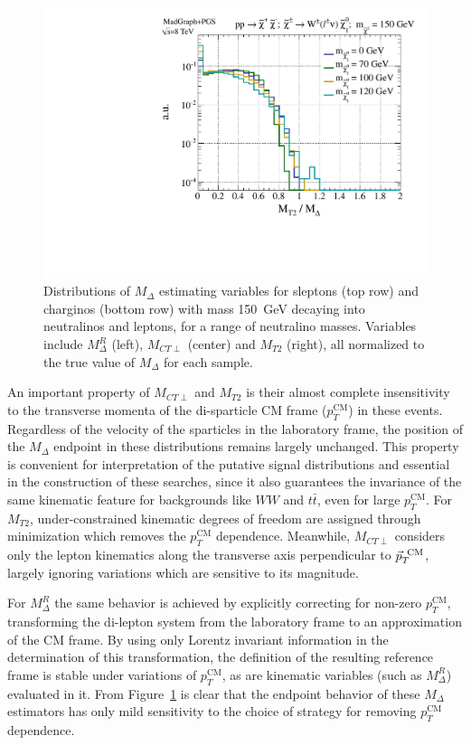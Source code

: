\begin{figure}[ht]
\includegraphics[width=0.3\columnwidth]{fig/sectionIII/MT2_norm_log_1D_chargino.pdf} 
\caption{Distributions of $M_{\Delta}$ estimating variables for sleptons (top row) and charginos (bottom row) with mass 150~GeV decaying into neutralinos and leptons, for a range of neutralino masses. Variables include $M_{\Delta}^{R}$ (left), $M_{CT\perp}$ (center) and $M_{T2}$ (right), all normalized to the true value of $M_{\Delta}$ for each sample. \label{fig:compare}}
\end{figure}

An important property of $M_{CT\perp}$ and $M_{T2}$ is their almost complete insensitivity to the transverse momenta of the di-sparticle CM frame ($p_{T}^\text{CM}$) in these events. Regardless of the velocity of the sparticles in the laboratory frame, the position of the $M_{\Delta}$ endpoint in these distributions remains largely unchanged. This property is convenient for interpretation of the putative signal distributions and essential in the construction of these searches, since it also guarantees the invariance of the same kinematic feature for backgrounds like $WW$ and $t\bar{t}$, even for large $p_{T}^\text{CM}$.  For $M_{T2}$, under-constrained kinematic degrees of freedom are assigned through minimization which removes the $p_{T}^\text{CM}$ dependence. Meanwhile, $M_{CT\perp}$ considers only the lepton kinematics along the transverse axis perpendicular to $\vec{p}_{T}^\text{\, CM}$, largely ignoring variations which are sensitive to its magnitude. 

For $M_{\Delta}^{R}$ the same behavior is achieved by explicitly correcting for non-zero $p_{T}^\text{CM}$, transforming the di-lepton system from the laboratory frame to an approximation of the CM frame. By using only Lorentz invariant information in the determination of this transformation, the definition of the resulting reference frame is stable under variations of $p_{T}^\text{CM}$, as are kinematic variables (such as $M_{\Delta}^{R}$) evaluated in it. From Figure~\ref{fig:compare} is clear that the endpoint behavior of these $M_{\Delta}$ estimators has only mild sensitivity to the choice of strategy for removing $p_{T}^\text{CM}$ dependence. 

